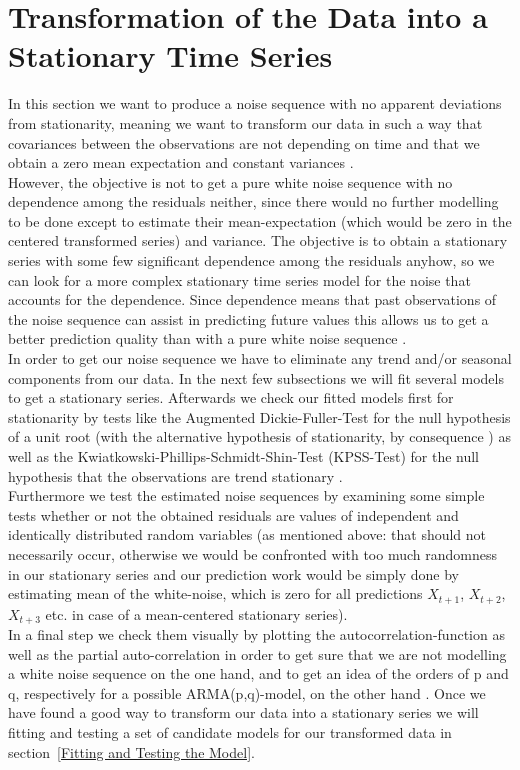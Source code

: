 \documentclass[11pt,a4paper]{article}
\begin{document}
\section{Transformation of the Data into a Stationary Time Series}
In this section we want to produce a noise sequence with no apparent deviations from stationarity, meaning we want to transform our data in such a way that covariances between the observations are not depending on time and that we obtain a zero mean expectation and constant variances \cite[pp.~14--23]{bd02}. \\
However, the objective is not to get a pure white noise sequence  with no dependence among the residuals neither, since there would no further modelling to be done except to estimate their mean-expectation (which would be zero in the centered transformed series) and variance. The objective is to obtain a stationary series with some few significant dependence among the residuals anyhow, so we can look for a more complex stationary time series model for the noise that accounts for the dependence. Since dependence means that past observations of the noise sequence can assist in predicting future values this allows us to get a better prediction quality than with a pure white noise sequence \cite[p.~35]{bd02}. \\

In order to get our noise sequence we have to eliminate any trend and/or seasonal components from our data. In the next few subsections we will fit several models to get a stationary series. Afterwards we check our fitted models first for stationarity by tests like the Augmented Dickie-Fuller-Test for the null hypothesis of a unit root (with the alternative hypothesis of stationarity, by consequence \citep{adf}) as well as the Kwiatkowski-Phillips-Schmidt-Shin-Test (KPSS-Test) for the null hypothesis that the observations are trend stationary \citep{kpss92}. \\
Furthermore we test the estimated noise sequences by examining some simple tests whether or not the obtained residuals are values of independent and identically distributed random variables (as mentioned above: that should not necessarily occur, otherwise we would be confronted with too much randomness in our stationary series and our prediction work would be simply done by estimating mean of the white-noise, which is zero for all predictions $X_{t+1}$, $X_{t+2}$, $X_{t+3}$ etc. in case of a mean-centered stationary series). \\
In a final step we check them visually by plotting the autocorrelation-function as well as the partial auto-correlation in order to get sure that we are not modelling a white noise sequence on the one hand, and to get an idea of the orders of p and q, respectively for a possible ARMA(p,q)-model, on the other hand \cite[pp.~83--110]{bd02}.
Once we have found a good way to transform our data into a stationary series we will fitting and testing a set of candidate models for our transformed data in section~\ref{Fitting and Testing the Model}.
\end{document}
